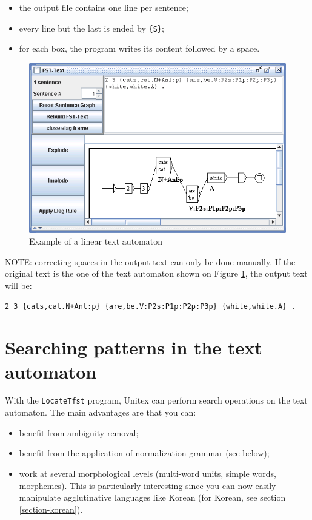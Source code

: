 \begin{itemize}
  \item the output file contains one line per sentence;
  \item every line but the last is ended by \verb+{S}+;
  \item for each box, the program writes its content followed by a space.
\end{itemize}

\begin{figure}[!ht]
\begin{center}
\includegraphics[width=12cm]{resources/img/fig7-26.png}
\caption{Example of a linear text automaton\label{fig-linear-automaton}}
\end{center}
\end{figure}

\bigskip
\noindent NOTE: correcting spaces in the output text can only be done manually. If the
original text is the one of the text automaton shown on Figure \ref{fig-linear-automaton},
the output text will be:

\begin{verbatim}
2 3 {cats,cat.N+Anl:p} {are,be.V:P2s:P1p:P2p:P3p} {white,white.A} .
\end{verbatim}


\section{Searching patterns in the text automaton}
\label{section-locate-tfst}
With the \verb+LocateTfst+ program, Unitex can perform search operations on the
text automaton. The main advantages are that you can:
\begin{itemize}
    \item benefit from ambiguity removal;
    \item benefit from the application of normalization grammar (see below);
    \item work at several morphological levels (multi-word units, simple words,
    morphemes). This is particularly interesting since you can now
    easily manipulate agglutinative languages like Korean (for Korean, see
    section \ref{section-korean}).
   
\end{itemize}

